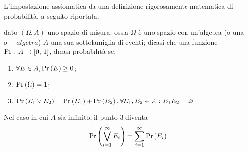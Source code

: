 \documentclass{subfiles}
\begin{document}
L'impostazione assiomatica da una definizione rigorosamente matematica di probabilità, a seguito riportata.
\begin{Definition*}
    dato \((\Omega, A)\) uno spazio di misura: ossia \(\Omega\) è uno spazio con un'algebra (o una \(\sigma-algebra\))   \(A\) una sua sottofamiglia di eventi;
    dicasi che una funzione \(\Pr \Such A \to \Range*{0}{1}\), dicasi probabilità se:
    \begin{enumerate}
        \item \(\forall E \in A, \Prob{E} \ge 0\);
        \item \(\Prob{\Omega} = 1\);
        \item \(\Prob{E_{1} \lor E_{2}} = \Prob{E_{1}} + \Prob{E_{2}}, \forall E_{1}, E_{2} \in A \Such E_{1}E_{2} = \varnothing\)
    \end{enumerate}
    Nel caso in cui \(A\) sia infinito, il punto 3 diventa
    \[
        \Prob{\Bigvee{E_{i}}{i = 1}[\infty]} = \Sum{\Prob{E_{i}}}{i = 1}[\infty]
    \]
\end{Definition*}
\end{document}
